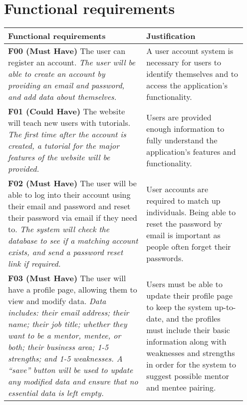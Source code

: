 \documentclass[10pt]{article}
\begin{document}
\vspace{-4mm}\section{Functional requirements}\vspace{-2mm}                         %
\begin{longtable}{|p{0.55\linewidth}|p{0.4\linewidth}|}
    \hline
    \textbf{Functional requirements}
        &
    \textbf{Justification}
    \\ \hline\hline

    \textbf{F00 (Must Have) }
    The user can register an account.
    \textit{The user will be able to create an account by providing an email and
    password, and add data about themselves.}
        &
    A user account system is necessary for users to identify themselves and to
    access the application's functionality.
    \\ \hline

    \textbf{F01 (Could Have) }
    The website will teach new users with tutorials.
    \textit{The first time after the account is created, a tutorial for the
    major features of the website will be provided.}
        &
    Users are provided enough information to fully understand the application's
    features and functionality.
    \\ \hline

    \textbf{F02 (Must Have) }
    The user will be able to log into their account using their email and
    password and reset their password via email if they need to.
    \textit{The system will check the database to see if a matching account
    exists, and send a password reset link if required.}
        &
    User accounts are required to match up individuals. Being able to reset the
    password by email is important as people often forget their passwords.
    \\ \hline

    \textbf{F03 (Must Have) }
    The user will have a profile page, allowing them to view and modify data.
    \textit{Data includes: their email address; their name; their job title;
    whether they want to be a mentor, mentee, or both; their business area; 1-5
    strengths; and 1-5 weaknesses. A “save” button will be used to update any
    modified data and ensure that no essential data is left empty.}
        &
    Users must be able to update their profile page to keep the system
    up-to-date, and the profiles must include their basic information along with
    weaknesses and strengths in order for the system to suggest possible mentor
    and mentee pairing.
    \\ \hline


\end{longtable}
\end{document}
